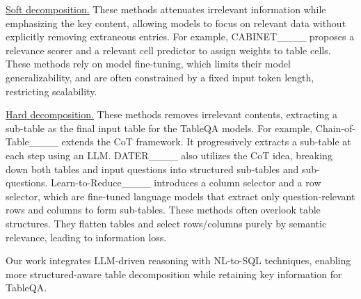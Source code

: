 \underline{Soft decomposition.} These methods attenuates irrelevant information while emphasizing the key content, allowing models to focus on relevant data without explicitly removing extraneous entries. For example, CABINET____ proposes a relevance scorer and a relevant cell predictor to assign weights to table cells. %
These methods rely on model fine-tuning, which limits their model generalizability, and are often constrained by a fixed input token length, restricting scalability.

\underline{Hard decomposition.} These methods removes irrelevant contents, extracting a sub-table as the final input table for the TableQA models. For example, Chain-of-Table____ extends the CoT framework. It progressively extracts a sub-table at each step using an LLM. DATER____ also utilizes the CoT idea, breaking down both tables and input questions into structured sub-tables and sub-questions. Learn-to-Reduce____ introduces a column selector and a row selector, which are fine-tuned language models that extract only question-relevant rows and columns to form sub-tables. 
These methods often overlook table structures. They flatten tables and select rows/columns purely by semantic relevance, leading to information loss. 

Our work integrates LLM-driven reasoning with NL-to-SQL techniques, enabling more structured-aware table decomposition while retaining key information for TableQA.